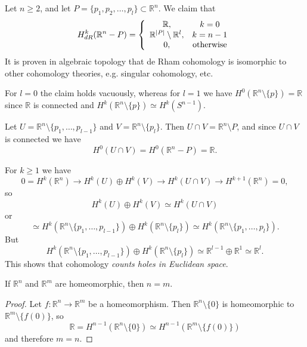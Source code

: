 \begin{xmpl}
Let $n \geq 2$, and let
$P = \{p_1, p_2, \dots, p_l \} \subset \mathbb{R}^n$. We claim that
$$
  H^k_{dR}(\mathbb{R}^n - P)
= \left\{
    \begin{array}{c c}
      \mathbb{R},                             & k = 0 \\
      \mathbb{R}^{|P|} \setminus \mathbb{R}^l, & k = n - 1 \\
      0,                                      & \text{otherwise}
    \end{array}
  \right.
$$
It is proven in algebraic topology that de Rham cohomology is
isomorphic to other cohomology theories, e.g. singular cohomology,
etc.

For $l = 0$ the claim holds vacuously, whereas for $l = 1$ we have
$H^0(\mathbb{R}^n \setminus \{ p \}) = \mathbb{R}$ since $\mathbb{R}$ is
connected
and $H^k(\mathbb{R}^n \setminus \{ p \}) \simeq H^k(S^{n-1})$.

Let $U = \mathbb{R}^n \setminus \{p_1, \dots, p_{l-1}\}$ and
$V = \mathbb{R}^n \setminus \{ p_l \}$. Then
$U \cap V = \mathbb{R}^n \setminus P$, and since $U \cap V$ is
connected we have
$$
H^0(U \cap V) = H^0(\mathbb{R}^n - P) = \mathbb{R}.
$$

For $k \geq 1$ we have
$$
0 = H^k(\mathbb{R}^n) \xrightarrow{}
H^k(U) \oplus H^k(V)  \xrightarrow{}
H^k(U \cap V)         \xrightarrow{}
H^{k+1}(\mathbb{R}^n) = 0,
$$
so
$$
       H^k(U) \oplus H^k(V)
\simeq H^k(U \cap V)
$$
or
$$
\simeq H^k(\mathbb{R}^n \setminus \{p_1, \dots, p_{l-1}\})
         \oplus
       H^k(\mathbb{R}^n \setminus \{p_l\})
\simeq H^k(\mathbb{R}^n \setminus \{ p_1, \dots, p_l \}).
$$
But
$$
       H^k(\mathbb{R}^n \setminus \{p_1, \dots, p_{l-1}\})
         \oplus
       H^k(\mathbb{R}^n \setminus \{p_l\})
\simeq \mathbb{R}^{l-1} \oplus \mathbb{R}^1
\simeq \mathbb{R}^l.
$$
This shows that cohomology \emph{counts holes in Euclidean space}.

\begin{corol}
If $\mathbb{R}^n$ and $\mathbb{R}^m$ are homeomorphic, then $n = m$.
\end{corol}
\begin{proof}
Let $f : \mathbb{R}^n \to \mathbb{R}^m$ be a homeomorphism. Then
$\mathbb{R}^n \setminus \{0\}$ is homeomorphic to $\mathbb{R}^m
\setminus \{f(0)\}$, so
$$
       \mathbb{R}
=      H^{n-1}(\mathbb{R}^n \setminus \{ 0 \})
\simeq H^{n-1}(\mathbb{R}^m \setminus \{ f(0) \})
$$
and therefore $m = n$.
\end{proof}

\end{xmpl}


